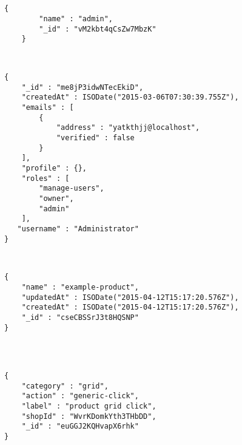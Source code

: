 \subsection{\rolCollection}

\medskip
\begin{lstlisting}[caption= \dataModelAS de \rolCollection, label=source:javascript:data_model_roll]
	{
	    "name" : "admin",
	    "_id" : "vM2kbt4qCsZw7MbzK"
	}
\end{lstlisting}



\subsection{\userscollection}

\medskip
\begin{lstlisting}[caption= \dataModelAS de \userscollection, label=source:javascript:data_model_user]

{
    "_id" : "me8jP3idwNTecEkiD",
    "createdAt" : ISODate("2015-03-06T07:30:39.755Z"),
    "emails" : [ 
        {
            "address" : "yatkthjj@localhost",
            "verified" : false
        }
    ],
    "profile" : {},
    "roles" : [ 
        "manage-users", 
        "owner", 
        "admin"
    ],
   "username" : "Administrator"
}
\end{lstlisting}

\subsection{\tagscollection}

\medskip
\begin{lstlisting}[caption= \dataModelAS de \tagscollection, label=source:javascript:data_model_tag]

{
    "name" : "example-product",
    "updatedAt" : ISODate("2015-04-12T15:17:20.576Z"),
    "createdAt" : ISODate("2015-04-12T15:17:20.576Z"),
    "_id" : "cseCBSSrJ3t8HQSNP"
}

\end{lstlisting}


\subsection{\analyEventcollection}

\medskip
\begin{lstlisting}[caption= \dataModelAS de \analyEventcollection, label=source:javascript:data_model_analy_event]


{
    "category" : "grid",
    "action" : "generic-click",
    "label" : "product grid click",
    "shopId" : "WvrKDomkYth3THbDD",
    "_id" : "euGGJ2KQHvapX6rhk"
}

\end{lstlisting}
